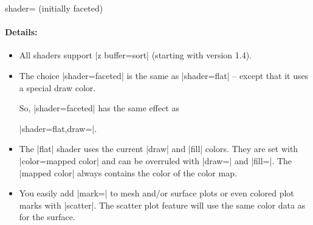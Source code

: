 {\begin{pgfplotskey}{shader= (initially faceted)%
}
    \paragraph{Details:}

    \begin{itemize}
        \item All shaders support |z buffer=sort| (starting with version
            1.4).
        \item The choice |shader=faceted| is the same as |shader=flat| --
            except that it uses a special draw color.

            So, |shader=faceted| has the same effect as

            |shader=flat,draw=|.
        \item The |flat| shader uses the current |draw| and |fill| colors.
            They are set with |color=mapped color| and can be overruled with
            |draw=| and |fill=|. The
            |mapped color| always contains the color of the color map.
        \item You easily add |mark=| to mesh and/or surface
            plots or even colored plot marks with |scatter|. The scatter plot
            feature will use the same color data as for the surface.


\end{itemize}
\end{pgfplotskey}}
